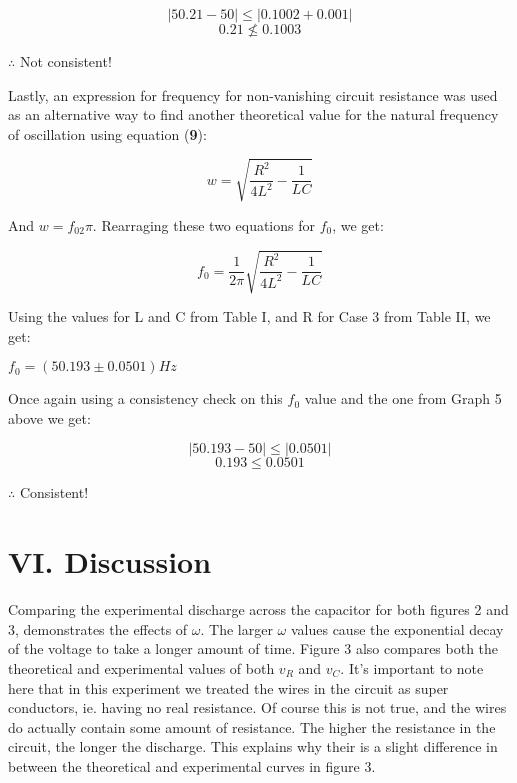 \documentclass[twocolumn, letterpaper, 10pt, twoside]{article}
\begin{document}
\begin{equation*}
|50.21 - 50| \leq |0.1002 + 0.001|
\end{equation*}
\begin{equation*}
0.21 \nleq 0.1003 
\end{equation*}

$\therefore$ Not consistent! 

Lastly, an expression for frequency for non-vanishing circuit resistance was used as an alternative way to find another theoretical value for the natural frequency of oscillation using equation (\textbf{9}): 

\begin{equation*}
w = \sqrt{\frac{R^2}{4L^2} - \frac{1}{LC}}
\end{equation*} 

And $w = f_02\pi$. Rearraging these two equations for $f_0$, we get: 

\begin{equation*}
f_0 = \frac{1}{2\pi} \sqrt{\frac{R^2}{4L^2} - \frac{1}{LC}}
\end{equation*}

Using the values for L and C from Table I, and R for Case 3 from Table II, we get: 

$f_0 = (50.193 \pm 0.0501) Hz$

Once again using a consistency check on this $f_0$ value and the one from Graph 5 above we get: 

\begin{equation*}
|50.193 - 50| \leq |0.0501|
\end{equation*}
\begin{equation*}
0.193 \leq 0.0501
\end{equation*}

$\therefore$ Consistent! 

    \section*{VI. Discussion}

Comparing the experimental discharge across the capacitor for both figures 2 and 3, demonstrates the effects of $\omega$. The larger $\omega$ values cause the exponential decay of the voltage to take a longer amount of time.  Figure 3 also compares both the theoretical and experimental values of both $v_R$ and $v_C$. It's important to note here that in this experiment we treated the wires in the circuit as super conductors, ie. having no real resistance. Of course this is not true, and the wires do actually contain some amount of resistance. The higher the resistance in the circuit, the longer the discharge. This explains why their is a slight difference in between the theoretical and experimental curves in figure 3. 
\end{document}
